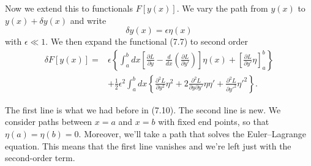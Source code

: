 \documentclass[11pt,a4paper,twoside]{article}
\newcommand{\pnum}[1]{\makebox[0pt][r]{\scriptsize\textbf{[#1]}\hspace{0.7em}}}
\begin{document}
\noindent\pnum{48}Now we extend this to functionals $F[y(x)]$. We vary the path from $y(x)$ to $y(x)+\delta y(x)$ and write
\begin{equation}
    \delta y(x)=\epsilon\eta(x)
    \tag{7.31}
\end{equation}
with $\epsilon\ll1$. We then expand the functional (7.7) to second order
\begin{equation}
    \begin{aligned}
        \delta F[y(x)]={} & \epsilon\left\{
        \int_a^b dx\left[\frac{\partial L}{\partial y}
            -\frac{d}{dx}\left(\frac{\partial L}{\partial y'}\right)\right]\eta(x)
        +\left[\frac{\partial L}{\partial y'}\eta\right]_a^b\right\} \\
                          & +\frac12\epsilon^2\int_a^b dx\left\{
        \frac{\partial^2 L}{\partial y^2}\eta^2
        +2\frac{\partial^2 L}{\partial y\partial y'}\eta\eta'
        +\frac{\partial^2 L}{\partial y'^2}\eta'^2\right\}.
    \end{aligned}
    \tag{7.32}
\end{equation}

\noindent\pnum{49}The first line is what we had before in (7.10). The second line is new. We consider paths between $x=a$ and $x=b$ with fixed end points, so that
$\eta(a)=\eta(b)=0$. Moreover, we'll take a path that solves the Euler--Lagrange equation. This means that the first line vanishes and we're left just with the second-order term.
\end{document}
